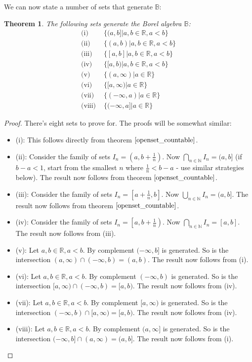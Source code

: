 \documentclass[12pt, a4paper]{article}
\newtheorem{theorem}{Theorem}[section]
\numberwithin{equation}{section}
\begin{document}
We can now state a number of sets that generate $\mathbb{B}$:

\begin{theorem}
\label{generate_borel}
The following sets generate the Borel algebra $\mathbb{B}$:
\begin{align}
\textrm{(i) }&\{(a,b]|a, b\in\mathbb{R}, a<b\} \\
\textrm{(ii) }&\{(a,b)|a, b\in\mathbb{R}, a<b\} \\
\textrm{(iii) }&\{[a,b]|a, b\in\mathbb{R}, a<b\} \\
\textrm{(iv) }&\{[a,b)|a, b\in\mathbb{R}, a<b\} \\
\textrm{(v) }&\{(a,\infty)|a\in\mathbb{R}\} \\
\textrm{(vi) }&\{[a,\infty)|a\in\mathbb{R}\} \\
\textrm{(vii) }&\{(-\infty,a)|a\in\mathbb{R}\} \\
\textrm{(viii) }&\{(-\infty,a]|a\in\mathbb{R}\}
\end{align}
\end{theorem}
\begin{proof}
There's eight sets to prove for. The proofs will be somewhat similar:
\begin{itemize}
\item (i): This follows directly from theorem $\ref{openset_countable}$.
\item (ii): Consider the family of sets $I_n=\left(a,b+\frac{1}{n}\right)$. Now $\bigcap_{n\in\mathbb{N}}I_n=(a,b]$ (if $b-a<1$, start from the smallest $n$ where $\frac{1}{n}<b-a$ - use similar strategies below). The result now follows from theorem $\ref{openset_countable}$.
\item (iii): Consider the family of sets $I_n=\left[a+\frac{1}{n},b\right]$. Now $\bigcup_{n\in\mathbb{N}}I_n=(a,b]$. The result now follows from theorem $\ref{openset_countable}$.
\item (iv): Consider the family of sets $I_n=\left[a,b+\frac{1}{n}\right)$. Now $\bigcap_{n\in\mathbb{N}}I_n=[a,b]$. The result now follows from (iii).
\item (v): Let $a,b\in\mathbb{R}, a<b$. By complement $(-\infty,b]$ is generated. So is the intersection $(a,\infty)\cap(-\infty,b)=(a,b)$. The result now follows from (i).
\item (vi): Let $a,b\in\mathbb{R}, a<b$. By complement $(-\infty,b)$ is generated. So is the intersection $[a,\infty)\cap(-\infty,b)=[a,b)$. The result now follows from (iv).
\item (vii): Let $a,b\in\mathbb{R}, a<b$. By complement $[a,\infty)$ is generated. So is the intersection $(-\infty,b)\cap[a,\infty)=[a,b)$. The result now follows from (iv).
\item (viii): Let $a,b\in\mathbb{R}, a<b$. By complement $(a,\infty]$ is generated. So is the intersection $(-\infty,b]\cap(a,\infty)=(a,b]$. The result now follows from (i).
\end{itemize}
\end{proof}
\end{document}
